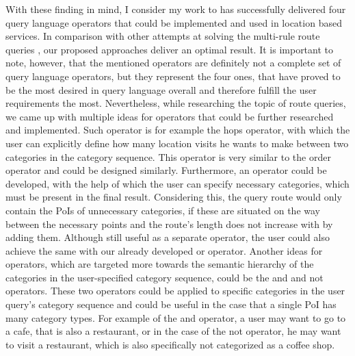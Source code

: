 With these finding in mind, I consider my work to has successfully delivered four query language operators that could be implemented and used in location based services. In comparison with other attempts at solving the multi-rule route queries \cite{multi}, our proposed approaches deliver an optimal result. It is important to note, however, that the mentioned operators are definitely not a complete set of query language operators, but they represent the four ones, that have proved to be the most desired in query language overall and therefore fulfill the user requirements the most. Nevertheless, while researching the topic of route queries, we came up with multiple ideas for operators that could be further researched and implemented. Such operator is for example the hops operator, with which the user can explicitly define how many location visits he wants to make between two categories in the category sequence. This operator is very similar to the order operator and could be designed similarly. Furthermore, an operator could be developed, with the help of which the user can specify necessary categories, which must be present in the final result. Considering this, the query route would only contain the PoIs of unnecessary categories, if these are situated on the way between the necessary points and the route's length does not increase with by adding them. Although still useful as a separate operator, the user could also achieve the same with our already developed or operator. \newline
Another ideas for operators, which are targeted more towards the semantic hierarchy of the categories in the user-specified category sequence, could be the and and not operators. These two operators could be applied to specific categories in the user query's category sequence and could be useful in the case that a single PoI has many category types. For example of the and operator, a user may want to go to a cafe, that is also a restaurant, or in the case of the not operator, he may want to visit a restaurant, which is also specifically not categorized as a coffee shop. \newline
